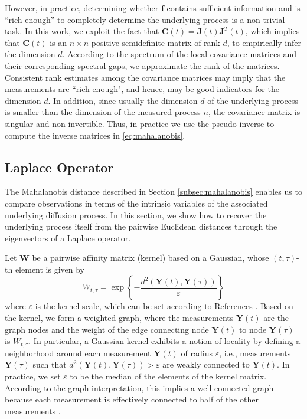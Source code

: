 \documentclass[aip,jcp,preprint]{revtex4-1}
\begin{document}
%
However, in practice, determining whether $\mathbf{f}$ contains sufficient information and is ``rich enough'' to completely determine the underlying process is a non-trivial task.
%
In this work, we exploit the fact that $\mathbf{C}(t) = \mathbf{J}(t)\mathbf{J}^T(t)$, which implies that $\mathbf{C}(t)$ is an $n \times n$ positive semidefinite matrix of rank $d$, to empirically infer the dimension $d$. 
%
According to the spectrum of the local covariance matrices and their corresponding spectral gaps, we approximate the rank of the matrices. 
%
Consistent rank estimates among the covariance matrices may imply that the measurements are ``rich enough", and hence, may be good indicators for the dimension $d$. 
%
In addition, since usually the dimension $d$ of the underlying process is smaller than the dimension of the measured process $n$, the covariance matrix is singular and non-invertible. 
%
Thus, in practice we use the pseudo-inverse to compute the inverse matrices in \eqref{eq:mahalanobis}.

\subsection{Laplace Operator}
The Mahalanobis distance described in Section \ref{subsec:mahalanobis} enables us to compare observations in terms of the intrinsic variables of the associated underlying diffusion process.
%
In this section, we show how to recover the underlying process itself from the pairwise Euclidean distances through the eigenvectors of a Laplace operator.

Let $\mathbf{W}$ be a pairwise affinity matrix (kernel) based on a Gaussian, whose $(t,\tau)$-th element is given by
\begin{equation}
	W_{t,\tau} = \exp \left\{ - \frac{ d^2(\mathbf{Y}(t), \mathbf{Y}(\tau) )} {\varepsilon}\right\}
	\label{eq:kernel}
\end{equation}
where $\varepsilon$ is the kernel scale, which can be set according to References .
%
Based on the kernel, we form a weighted graph, where the measurements $\mathbf{Y}(t)$ are the graph nodes and the weight of the edge connecting node $\mathbf{Y}(t)$ to node $\mathbf{Y}(\tau)$ is $W_{t,\tau}$.
%
In particular, a Gaussian kernel exhibits a notion of locality by defining a neighborhood around each measurement $\mathbf{Y}(t)$ of radius $\varepsilon$,
i.e., measurements $\mathbf{Y}(\tau)$ such that $d^2(\mathbf{Y}(t), \mathbf{Y}(\tau) ) > \varepsilon$ are weakly connected to $\mathbf{Y}(t)$.
%
In practice, we set $\varepsilon$ to be the median of the elements of the kernel matrix.
%
According to the graph interpretation, this implies a well connected graph because each measurement is effectively connected to half of the other measurements \cite{rohrdanz2011determination}.
\end{document}
